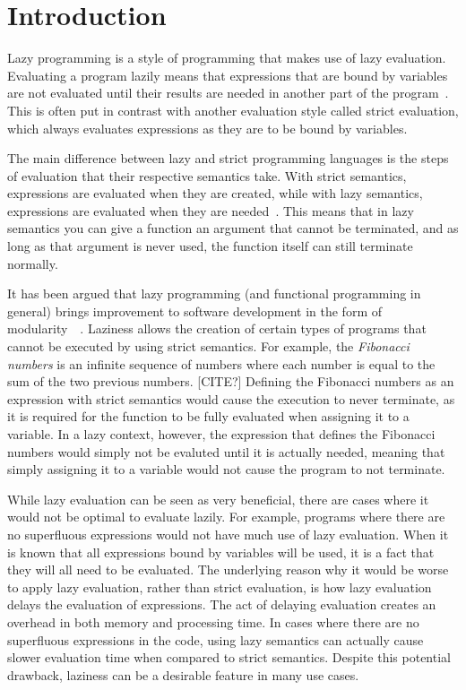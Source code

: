 \chapter{Introduction}
Lazy programming is a style of programming that makes use of lazy evaluation.
Evaluating a program lazily means that expressions that are bound by variables
are not evaluated until their results are needed in another part of the
program~\cite{Lazyeval6:online}. This is often put in contrast with another
evaluation style called strict evaluation, which always evaluates expressions
as they are to be bound by variables. 

The main difference between lazy and strict programming languages is the steps
of evaluation that their respective semantics take. With strict semantics,
expressions are evaluated when they are created, while with lazy semantics,
expressions are evaluated when they are needed~\cite{ThunkHas27:online}.
This means that in lazy semantics
you can give a function an argument that cannot be terminated, and as long as
that argument is never used, the function itself can still terminate normally.

It has been argued that lazy programming (and functional programming in general)
brings improvement to software development in the form of
modularity~\cite{Hu1989}~\cite{Hu2015}. Laziness allows the creation of certain
types of programs that cannot be executed by using strict semantics.
For example, the \textit{Fibonacci numbers} is an infinite sequence of numbers
where each number is equal to the sum of the two previous numbers. [CITE?]
Defining the Fibonacci numbers as an expression with strict semantics would
cause the execution to never terminate, as it is required for the function to be
fully evaluated when assigning it to a variable. In a lazy context, however,
the expression that defines the Fibonacci numbers would simply not be evaluted
until it is actually needed, meaning that simply assigning it to a variable
would not cause the program to not terminate.

While lazy evaluation can be seen as very beneficial, there are cases where it
would not be optimal to evaluate lazily. For example, programs where there are
no superfluous expressions would not have much use of lazy evaluation. When it
is known that all expressions bound by variables will be used, it is a fact that
they will all need to be evaluated. The underlying reason why it would be worse
to apply lazy evaluation, rather than strict evaluation, is how lazy evaluation
delays the evaluation of expressions. The act of delaying evaluation creates
an overhead in both memory and processing time.
In cases where there are no superfluous expressions in the code, using lazy
semantics can actually cause slower evaluation time when compared to
strict semantics. Despite this potential drawback, laziness can be a desirable
feature in many use cases. 

